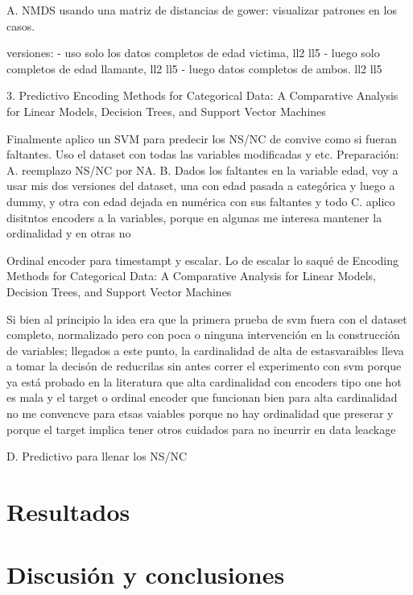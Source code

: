 \documentclass[10pt, spanish]{article}
\begin{document}
A. NMDS usando una matriz de distancias de gower: visualizar patrones en los casos. 

versiones:  
- uso solo los datos completos de edad victima, ll2 ll5
- luego solo completos de edad llamante, ll2 ll5
- luego datos completos de ambos. ll2 ll5



3. Predictivo
Encoding Methods for Categorical Data: A Comparative Analysis for Linear Models, Decision Trees, and Support Vector Machines

Finalmente aplico un SVM para predecir los NS/NC de convive como si fueran faltantes.
Uso el dataset con todas las variables modificadas y etc.
Preparación: 
A. reemplazo NS/NC por NA.
B. Dados los faltantes en la variable edad, voy a usar mis dos versiones del dataset, una con
edad pasada a categórica y luego a dummy, y otra con edad dejada en numérica con sus faltantes y todo
C. aplico disitntos encoders a la variables, porque en algunas me interesa mantener la ordinalidad y en otras no


Ordinal encoder para timestampt y escalar. Lo de escalar lo saqué de Encoding Methods for Categorical Data: A Comparative Analysis for Linear Models, Decision Trees, and Support Vector Machines


Si bien al principio la idea era que la primera prueba de svm fuera con el dataset completo, normalizado pero con poca o ninguna intervención en la construcción de variables; llegados a este punto, la cardinalidad de alta de estasvaraibles lleva a tomar la decisón de reducrilas sin antes correr el experimento con svm porque ya está probado en la literatura que alta cardinalidad con encoders tipo one hot es mala y el target o ordinal encoder que funcionan bien para alta cardinalidad no me convencve para etsas vaiables porque no hay ordinalidad que preserar y porque el target implica tener otros cuidados para no incurrir en data leackage


D. Predictivo para llenar los NS/NC  

\section{Resultados}\label{res}

\section{Discusión y conclusiones}\label{conc}















\newpage


\end{document}
